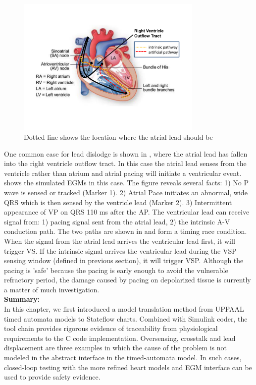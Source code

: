  \begin{figure}
\center
\includegraphics[width=0.80\textwidth]{figs/race_cond.pdf}
\caption{Dotted line shows the location where the atrial lead should be}
\label{fig:race_cond}
\end{figure}

One common case for lead dislodge is shown in , where the atrial lead has fallen into the right ventricle outflow tract. In this case the atrial lead senses from the ventricle rather than atrium and atrial pacing will initiate a ventricular event.  shows the simulated EGMs in this case. The figure reveals several facts: 1) No P wave is sensed or tracked (Marker 1). 2) Atrial Pace initiates an abnormal, wide QRS which is then sensed by the ventricle lead (Marker 2). 3) Intermittent appearance of VP on QRS 110 ms after the AP. The ventricular lead can receive signal from: 1) pacing signal sent from the atrial lead, 2) the intrinsic A-V conduction path. The two paths are shown in  and form a timing race condition. When the signal from the atrial lead arrives the ventricular lead first, it will trigger VS. If the intrinsic signal arrives the ventricular lead during the VSP sensing window (defined in previous section), it will trigger VSP. Although the pacing is 'safe' because the pacing is early enough to avoid the vulnerable refractory period, the damage caused by pacing on depolarized tissue is currently a matter of much investigation.\\

\noindent\textbf{Summary:}\\
In this chapter, we first introduced a model translation method from UPPAAL timed automata models to Stateflow charts. Combined with Simulink coder, the tool chain provides rigorous evidence of traceability from physiological requirements to the C code implementation. Oversensing, crosstalk and lead displacement are three examples in which the cause of the problem is not modeled in the abstract interface in the timed-automata model. In such cases, closed-loop testing with the more refined heart models and EGM interface can be used to provide safety evidence.

